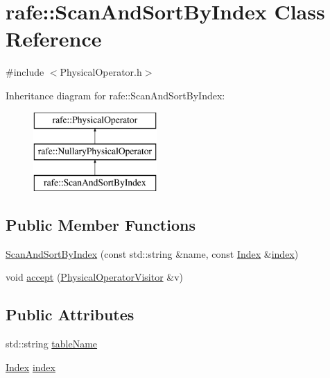\hypertarget{classrafe_1_1_scan_and_sort_by_index}{\section{rafe\+:\+:Scan\+And\+Sort\+By\+Index Class Reference}
\label{classrafe_1_1_scan_and_sort_by_index}
}


{\ttfamily \#include $<$Physical\+Operator.\+h$>$}

Inheritance diagram for rafe\+:\+:Scan\+And\+Sort\+By\+Index\+:\begin{figure}[H]
\begin{center}
\leavevmode
\includegraphics[height=3.000000cm]{classrafe_1_1_scan_and_sort_by_index}
\end{center}
\end{figure}
\subsection*{Public Member Functions}
\begin{DoxyCompactItemize}
\item 
\hyperlink{classrafe_1_1_scan_and_sort_by_index_a375abca591223d619fe86074e4e72d47}{Scan\+And\+Sort\+By\+Index} (const std\+::string \&name, const \hyperlink{classrafe_1_1_index}{Index} \&\hyperlink{classrafe_1_1_scan_and_sort_by_index_a098de983bcb2456f2b904bea0dbd2bb8}{index})
\item 
void \hyperlink{classrafe_1_1_scan_and_sort_by_index_aabb5d931b679a14bde40a1928ac10a52}{accept} (\hyperlink{classrafe_1_1_physical_operator_visitor}{Physical\+Operator\+Visitor} \&v)
\end{DoxyCompactItemize}
\subsection*{Public Attributes}
\begin{DoxyCompactItemize}
\item 
std\+::string \hyperlink{classrafe_1_1_scan_and_sort_by_index_abdcff33645fc0806646167276cc3c46f}{table\+Name}
\item 
\hyperlink{classrafe_1_1_index}{Index} \hyperlink{classrafe_1_1_scan_and_sort_by_index_a098de983bcb2456f2b904bea0dbd2bb8}{index}
\end{DoxyCompactItemize}


